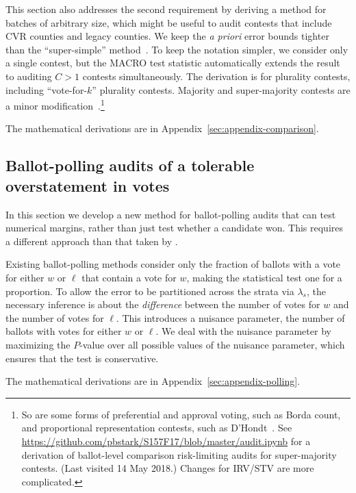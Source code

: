 \documentclass[runningheads]{llncs}
\begin{document}
This section also addresses the second requirement by deriving a method for batches of arbitrary size, which might be useful
 to audit contests that include CVR counties and legacy counties.
We keep the \emph{a priori} error bounds tighter than the ``super-simple'' 
method~\cite{stark10d}.
To keep the notation simpler, we consider only a single contest, but the 
MACRO test statistic \cite{stark09c,stark10d} automatically extends the result to 
auditing $C>1$ contests simultaneously.
The derivation is for plurality contests, including ``vote-for-$k$'' plurality contests.
Majority and super-majority contests are a minor 
modification~\cite{stark08a}.\footnote{%
  So are some forms of preferential and approval voting, such as Borda count, and
  proportional representation contests, such as D'Hondt~\cite{starkTeague14}.
  See \url{https://github.com/pbstark/S157F17/blob/master/audit.ipynb} for a derivation
  of ballot-level comparison risk-limiting audits for super-majority contests. (Last visited 14 May 2018.)
  Changes for IRV/STV are more complicated.
}

The mathematical derivations are in Appendix~\ref{sec:appendix-comparison}.



%
\subsection{Ballot-polling audits of a tolerable overstatement in votes}
\label{sec:ballotPollError}

In this section we develop a new method for ballot-polling audits that can test numerical margins,
rather than just test whether a candidate won.
This requires a different approach than that taken by \cite{lindemanEtal12}.

Existing ballot-polling methods consider only the fraction of ballots with a vote for either 
$w$ or $\ell$ that contain a vote for $w$,
making the statistical test one for a proportion.
To allow the error to be partitioned across the strata via $\lambda_s$,
the necessary inference is about the 
\emph{difference} between the number of votes for $w$ and the number of votes for $\ell$.
This introduces a nuisance parameter, the number of ballots with votes for either $w$ or $\ell$.
We deal with the nuisance parameter by maximizing the $P$-value 
over all possible values of the nuisance parameter, which ensures that the test is conservative.

The mathematical derivations are in Appendix~\ref{sec:appendix-polling}.
\end{document}
